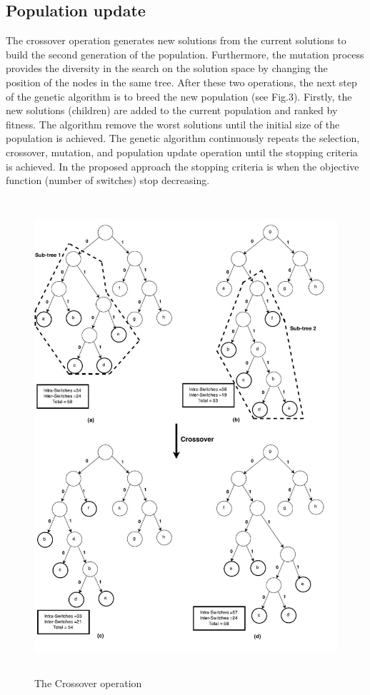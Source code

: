 \documentclass[preprint,12pt]{elsarticle}
\begin{document}
\subsection{Population update}
The crossover operation generates new solutions from the current solutions to build the second generation of the population. Furthermore, the mutation process provides the diversity in the search on the solution space by changing the position of the nodes in the same tree. After these two operations, the next step of the genetic algorithm is to breed the new population (see Fig.3). Firstly, the new solutions (children) are added to the current population and ranked by fitness. The algorithm remove the worst solutions until the initial size of the population is achieved. The genetic algorithm  continuously repeats the selection, crossover, mutation, and population update operation until the stopping criteria is achieved. In the proposed approach the stopping criteria is when the objective function (number of switches) stop decreasing.
\begin{figure}[tbph]
\begin{center}
\includegraphics[width=380pt,height=500pt]{Images/figure1.jpg}
\caption{The Crossover operation}
\end{center}
\label{Fig1}
\end{figure}
\end{document}
